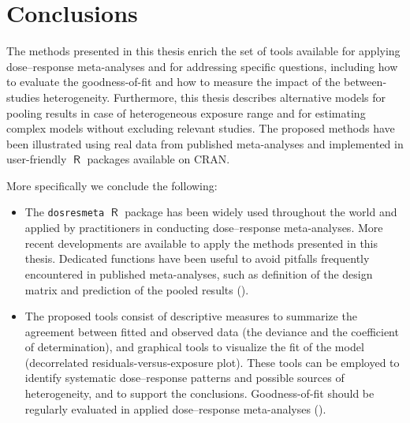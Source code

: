 \documentclass[11pt,a4paper,twoside,openany]{book}\usepackage{knitr}
\DeclareMathOperator{\R}{\textsf{R}}
\begin{document}
{{%

%

\chapter{Conclusions}

The methods presented in this thesis enrich the set of tools available for applying dose--response meta-analyses and for addressing specific questions, including how to evaluate the goodness-of-fit and how to measure the impact of the between-studies heterogeneity. Furthermore, this thesis describes alternative models for pooling results in case of heterogeneous exposure range and for estimating complex models without excluding relevant studies. The proposed methods have been illustrated using real data from published meta-analyses and implemented in user-friendly $\R$ packages available on CRAN. 

More specifically we conclude the following:

\begin{itemize}

\item The \texttt{dosresmeta} $\R$ package has been widely used throughout the world and applied by practitioners in conducting dose--response meta-analyses. More recent developments are available to apply the methods presented in this thesis. Dedicated functions have been useful to avoid pitfalls frequently encountered in published meta-analyses, such as definition of the design matrix and prediction of the pooled results ().

\item The proposed tools consist of descriptive measures to summarize the agreement between fitted and observed data (the deviance and the coefficient of determination), and graphical tools to visualize the fit of the model (decorrelated residuals-versus-exposure plot). These tools can be employed to identify systematic dose--response patterns and possible sources of heterogeneity, and to support the conclusions. Goodness-of-fit should be regularly evaluated in applied dose--response meta-analyses ().


\end{itemize}}}
\end{document}
